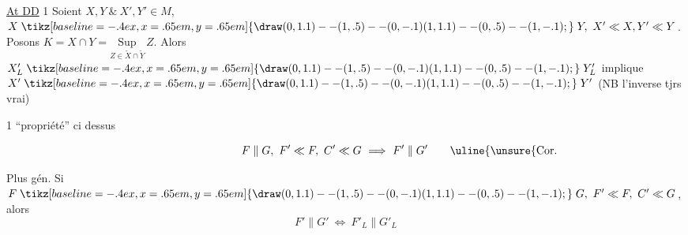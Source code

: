 \uline{At DD} 1 Soient  $X,Y\ \&\ X',Y'\in M$, $X\mathrel{\tikz[baseline=-.4ex,x=.65em,y=.65em]{\draw (0,1.1)--(1,.5)--(0,-.1) (1,1.1)--(0,.5)--(1,-.1);}}Y,\ X'\ll X,Y'\ll Y$. Posons $K=X\cap Y=\underset{Z\in\widetilde X\cap\widetilde Y}{\mathrm{Sup}}\,Z$. Alors $X'_{L}\mathrel{\tikz[baseline=-.4ex,x=.65em,y=.65em]{\draw (0,1.1)--(1,.5)--(0,-.1) (1,1.1)--(0,.5)--(1,-.1);}}Y'_{L}$ implique $X'\mathrel{\tikz[baseline=-.4ex,x=.65em,y=.65em]{\draw (0,1.1)--(1,.5)--(0,-.1) (1,1.1)--(0,.5)--(1,-.1);}}Y'$ \quad (NB l'inverse  tjrs vrai)

\uline{} 1 \quad {} ``propriété'' ci dessus

\[
F\parallel G,\ F'\ll F,\ C'\ll G\ \Longrightarrow\ F'\parallel G'
\tag*{\makebox[0pt][r]{\makebox[\displaywidth][l]{\uline{\unsure{Cor. Main|Corollaire}} 2}}}
\]

Plus gén. \quad Si $F\mathrel{\tikz[baseline=-.4ex,x=.65em,y=.65em]{\draw (0,1.1)--(1,.5)--(0,-.1) (1,1.1)--(0,.5)--(1,-.1);}}G,\ F'\ll F,\ C'\ll G$, alors
\[
 F'\parallel G'\ \Longleftrightarrow\ F'_{L}\parallel G'_{L}
\]
